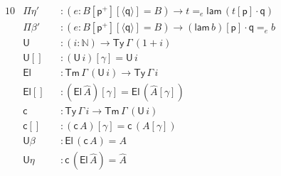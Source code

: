 \documentclass[sigplan,10pt,anonymous,review]{acmart}\settopmatter{printfolios=true,printccs=false,printacmref=false}
\newcommand{\ra}{\rightarrow}
\newcommand{\Ty}{\mathsf{Ty}}
\newcommand{\Tm}{\mathsf{Tm}}
\newcommand{\p}{\mathsf{p}}
\newcommand{\q}{\mathsf{q}}
\newcommand{\N}{\mathbb{N}}
\newcommand{\lam}{\mathsf{lam}}
\newcommand{\U}{\mathsf{U}}
\newcommand{\El}{\mathsf{El}}
\newcommand{\cd}{\mathsf{c}}
\begin{document}
\begin{alignat*}{10}
  & \Pi\eta' && : (e:B[\p^+][\langle\q\rangle] = B)\ra t =_e \lam\,(t[\p]\cdot\q) \\
  & \Pi\beta' && : (e:B[\p^+][\langle\q\rangle] = B)\ra (\lam\,b)[\p]\cdot\q =_e b \\
  & \U && : (i:\N)\ra\Ty\,\Gamma\,(1+i) \\
  & \U[] && : (\U\,i)[\gamma] = \U\,i \\  
  & \El && : \Tm\,\Gamma\,(\U\,i) \ra \Ty\,\Gamma\,i \\
  & \El[] && : (\El\,\hat{A})[\gamma] = \El\,(\hat{A}[\gamma]) \\
  & \cd && : \Ty\,\Gamma\,i\ra\Tm\,\Gamma\,(\U\,i) \\
  & \cd[] && : (\cd\,A)[\gamma] = \cd\,(A[\gamma]) \\
  & \U\beta && : \El\,(\cd\,A) = A \\
  & \U\eta && : \cd\,(\El\,\hat{A}) = \hat{A}
\end{alignat*}
\end{document}
